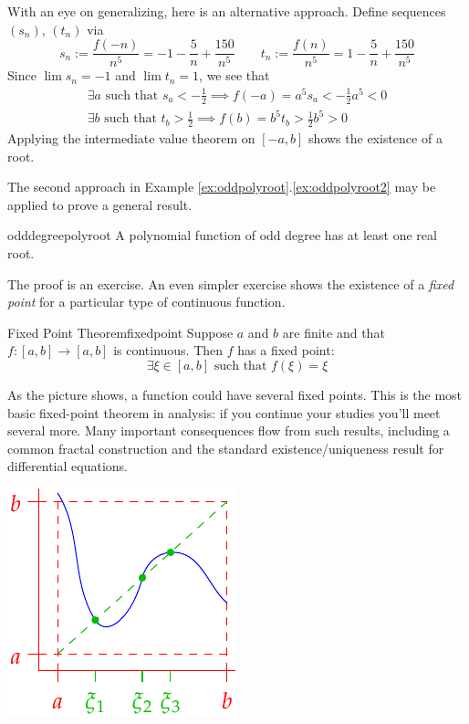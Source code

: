 \begin{examples}{}{}
\begin{enumerate}
		With an eye on generalizing, here is an alternative approach. Define sequences $(s_n)$, $(t_n)$ via
		\[
			s_n:=\frac{f(-n)}{n^5} =-1-\frac{5}n+\frac{150}{n^5}
			\qquad
			t_n:=\frac{f(n)}{n^5}= 1-\frac{5}n+\frac{150}{n^5}
		\]
		Since $\lim s_n=-1$ and $\lim t_n=1$,  we see that
		\begin{gather*}
			\exists a\text{ such that }s_a<-\frac 12\implies f(-a)=a^5s_a<-\frac 12a^5<0\\
			\exists b\text{ such that }t_b>\frac 12\implies f(b)=b^5t_b>\frac 12b^5>0
		\end{gather*}
		Applying the intermediate value theorem on $[-a,b]$ shows the existence of a root.
	\end{enumerate}
\end{examples}

The second approach in Example \ref*{ex:oddpolyroot}.\ref{ex:oddpolyroot2} may be applied to prove a general result.

\begin{cor}{}{odddegreepolyroot}
	A polynomial function of odd degree has at least one real root.
\end{cor}


The proof is an exercise. An even simpler exercise shows the existence of a \emph{fixed point} for a particular type of continuous function. 


\begin{cor}{Fixed Point Theorem}{fixedpoint}
	Suppose $a$ and $b$ are finite and that $f:[a,b]\to [a,b]$ is continuous. Then $f$ has a fixed point:
	\[\exists\xi\in[a,b]\text{ such that }f(\xi)=\xi\]
\end{cor}

\begin{minipage}[t]{0.7\linewidth}\vspace{0pt}
	As the picture shows, a function could have several fixed points.\smallbreak
	This is the most basic fixed-point theorem in analysis: if you continue your studies you'll meet several more. Many important consequences flow from such results, including a common fractal construction and the standard existence/uniqueness result for differential equations. 
\end{minipage}
\hfill
\begin{minipage}[t]{0.29\linewidth}\vspace{0pt}
	\flushright\includegraphics[scale=0.95]{intval3}
\end{minipage}


